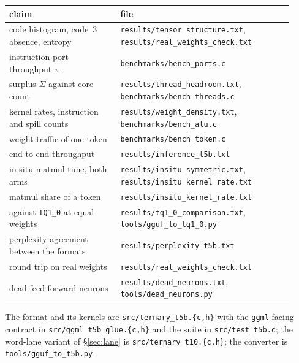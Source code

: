 \documentclass[11pt,a4paper]{article}
\newcommand{\code}[1]{\texttt{#1}}
\begin{document}
\begin{center}
\small
\begin{tabular}{@{}>{\raggedright\arraybackslash}p{0.36\linewidth}>{\raggedright\arraybackslash}p{0.56\linewidth}@{}}
\toprule
claim & file \\
\midrule
code histogram, code~3 absence, entropy & \code{results/tensor\_structure.txt}, \code{results/real\_weights\_check.txt} \\
instruction-port throughput $\pi$ & \code{benchmarks/bench\_ports.c} \\
surplus $\Sigma$ against core count & \code{results/thread\_headroom.txt}, \code{benchmarks/bench\_threads.c} \\
kernel rates, instruction and spill counts & \code{results/weight\_density.txt}, \code{benchmarks/bench\_alu.c} \\
weight traffic of one token & \code{benchmarks/bench\_token.c} \\
end-to-end throughput & \code{results/inference\_t5b.txt} \\
in-situ matmul time, both arms & \code{results/insitu\_symmetric.txt}, \code{results/insitu\_kernel\_rate.txt} \\
matmul share of a token & \code{results/insitu\_kernel\_rate.txt} \\
against \code{TQ1\_0} at equal weights & \code{results/tq1\_0\_comparison.txt}, \code{tools/gguf\_to\_tq1\_0.py} \\
perplexity agreement between the formats & \code{results/perplexity\_t5b.txt} \\
round trip on real weights & \code{results/real\_weights\_check.txt} \\
dead feed-forward neurons & \code{results/dead\_neurons.txt}, \code{tools/dead\_neurons.py} \\
\bottomrule
\end{tabular}
\end{center}

The format and its kernels are \code{src/ternary\_t5b.\{c,h\}} with the
\code{ggml}-facing contract in \code{src/ggml\_t5b\_glue.\{c,h\}} and the suite in
\code{src/test\_t5b.c}; the word-lane variant of \S\ref{sec:lane} is
\code{src/ternary\_t10.\{c,h\}}; the converter is \code{tools/gguf\_to\_t5b.py}.
\end{document}
